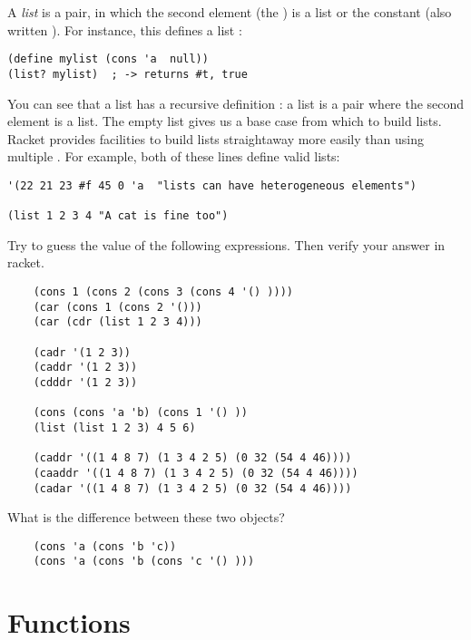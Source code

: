\documentclass{../../../tp}
\begin{document}
A \emph{list} is a pair, in which the second element (the \cdr) is a list or the constant  (also written ). For instance, this defines a list :

\begin{verbatim}
(define mylist (cons 'a  null))
(list? mylist) 	; -> returns #t, true
\end{verbatim}

You can see that a list has a recursive definition : a list is a pair where the second element is a list. The empty list  gives us a base case from which to build lists. Racket provides facilities to build lists straightaway more easily than using multiple . For example, both of these lines define valid lists:

\begin{verbatim}
'(22 21 23 #f 45 0 'a  "lists can have heterogeneous elements")

(list 1 2 3 4 "A cat is fine too")
\end{verbatim}



\begin{instruction}
Try to guess the value of the following expressions. Then verify your answer in racket.

\begin{verbatim}
	(cons 1 (cons 2 (cons 3 (cons 4 '() ))))
	(car (cons 1 (cons 2 '()))
	(car (cdr (list 1 2 3 4)))
	
	(cadr '(1 2 3))
	(caddr '(1 2 3))
	(cdddr '(1 2 3))
	
	(cons (cons 'a 'b) (cons 1 '() ))
	(list (list 1 2 3) 4 5 6)
	
	(caddr '((1 4 8 7) (1 3 4 2 5) (0 32 (54 4 46))))
	(caaddr '((1 4 8 7) (1 3 4 2 5) (0 32 (54 4 46))))
	(cadar '((1 4 8 7) (1 3 4 2 5) (0 32 (54 4 46))))
\end{verbatim}
	
What is the difference between these two objects?
		
	\begin{verbatim}
	(cons 'a (cons 'b 'c))
	(cons 'a (cons 'b (cons 'c '() ))) 	
	\end{verbatim}
			
\end{instruction}



\section{Functions}
\end{document}
